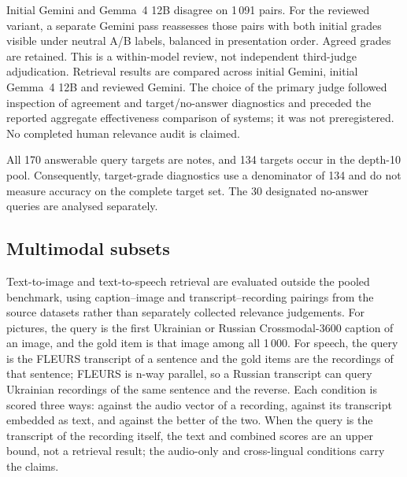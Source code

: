 Initial Gemini and Gemma~4 12B disagree on 1\,091 pairs. For the reviewed variant, a separate Gemini pass reassesses those pairs with both initial grades visible under neutral A/B labels, balanced in presentation order. Agreed grades are retained. This is a within-model review, not independent third-judge adjudication. Retrieval results are compared across initial Gemini, initial Gemma~4 12B and reviewed Gemini. The choice of the primary judge followed inspection of agreement and target/no-answer diagnostics and preceded the reported aggregate effectiveness comparison of systems; it was not preregistered. No completed human relevance audit is claimed.

All 170 answerable query targets are notes, and 134 targets occur in the depth-10 pool. Consequently, target-grade diagnostics use a denominator of 134 and do not measure accuracy on the complete target set. The 30 designated no-answer queries are analysed separately.

\subsection{Multimodal subsets}
Text-to-image and text-to-speech retrieval are evaluated outside the pooled benchmark, using caption--image and transcript--recording pairings from the source datasets rather than separately collected relevance judgements. For pictures, the query is the first Ukrainian or Russian Crossmodal-3600 caption of an image, and the gold item is that image among all 1\,000. For speech, the query is the FLEURS transcript of a sentence and the gold items are the recordings of that sentence; FLEURS is n-way parallel, so a Russian transcript can query Ukrainian recordings of the same sentence and the reverse. Each condition is scored three ways: against the audio vector of a recording, against its transcript embedded as text, and against the better of the two. When the query is the transcript of the recording itself, the text and combined scores are an upper bound, not a retrieval result; the audio-only and cross-lingual conditions carry the claims.
